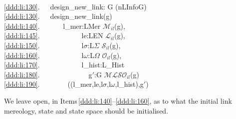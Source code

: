 {%
\bp
{}\\
\ref{ddd:li:130}.\ \ \ design\_new\_link: G {\RIGHTARROW} (nLInfo{\TIMES}G)\\
\ref{ddd:li:130}.\ \ \ design\_new\_link(g) {\IS} \\
\ref{ddd:li:140}.\ \ \ \ \ \  l\_mer:LMer {\EQ} $\mathcal{M}_{il}$(g),\\
\ref{ddd:li:145}.\ \ \ \ \ \ \ \ \ \ \ \ le:LEN {\EQ} $\mathcal{L}_{il}$(g),\\
\ref{ddd:li:150}.\ \ \ \ \ \ \ \ \ \ \ \ l$\sigma$:L$\Sigma$ {\EQ} $\mathcal{S}_{il}$(g),\\
\ref{ddd:li:160}.\ \ \ \ \ \ \ \ \ \ \ \ l$\omega$:L$\Omega$ {\EQ} $\mathcal{O}_{il}$(g),\\
\ref{ddd:li:170}.\ \ \ \ \ \ \ \ \ \ \ \ l\_hist:L\_Hist {\EQ} {\emptymap}\\
\ref{ddd:li:180}.\ \ \ \ \ \ \ \ \ \ \ \ \ \ g$'$:G {\EQ} $\mathcal{MLSO}_{il}$(g) \\
\ref{ddd:li:190}.\ \ \ \ \ \ \ \ ((l\_mer,le,l$\sigma$,l$\omega$,l\_hist),g$'$) 
\ep

\noindent
\begynd
\pind We leave open, in Items\,\ref{ddd:li:140}--\ref{ddd:li:160},
      as to what \nyl the initial link mereology, state and state space
      should be initialised.
\afslut
      
}
